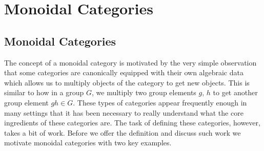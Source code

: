\chapter{Monoidal Categories}

\section{Monoidal Categories}

The concept of a monoidal category is motivated by the very simple observation that 
some categories are canonically equipped with their own algebraic data which allows us 
to multiply objects of the category to get new objects. This is similar to how in a group $G$, 
we multiply two group elements $g$, $h$ to get another group element
$gh \in G$. These types of categories appear frequently enough in many 
settings that it has been necessary to really understand what the core ingredients of these categories are. 
The task of defining these categories, however, takes a bit of work. Before we 
offer the definition and discuss such work we motivate monoidal categories with two key 
examples. 

